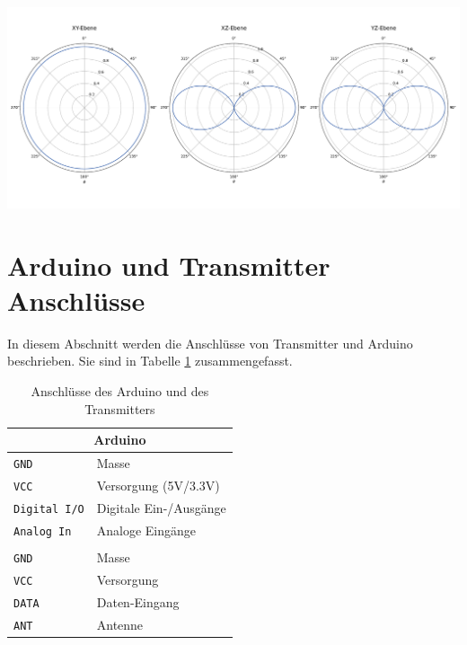 \begin{lösung}
    \centering
    \includegraphics[width=.9\textwidth]{images/polar_radiation_pattern.pdf}
\end{lösung}




\section{Arduino und Transmitter Anschlüsse}
In diesem Abschnitt werden die Anschlüsse von Transmitter und Arduino beschrieben. Sie sind in Tabelle \ref{tab:arduino_transmitter_connections} zusammengefasst.

\begin{table}[H]
\centering
\noindent
\begin{tabular}{l l}
    \toprule
    \multicolumn{2}{c}{\textbf{Arduino}} \\
    \midrule
    \texttt{GND} & Masse \\
    \texttt{VCC} & Versorgung (5V/3.3V) \\
    \texttt{Digital I/O} & Digitale Ein-/Ausgänge \\
    \texttt{Analog In} & Analoge Eingänge \\
    \addlinespace %
    \addlinespace
    \multicolumn{2}{c}{\textbf{Transmitter}} \\
    \midrule
    \texttt{GND} & Masse \\
    \texttt{VCC} & Versorgung \\
    \texttt{DATA} & Daten-Eingang \\
    \texttt{ANT} & Antenne \\
    \bottomrule

\end{tabular}
\caption{Anschlüsse des Arduino und des Transmitters}
\label{tab:arduino_transmitter_connections}
\end{table}


